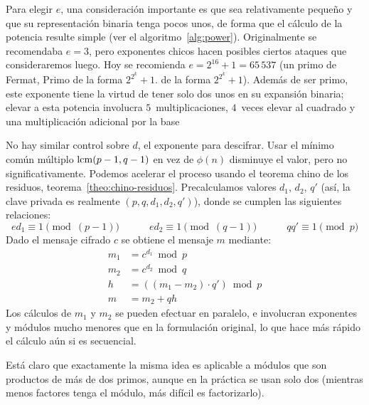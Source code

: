   Para elegir \(e\),
  una consideración importante es que sea relativamente pequeño
  y que su representación binaria tenga pocos unos,
  de forma que el cálculo de la potencia resulte simple
  (ver el algoritmo~\ref{alg:power}).
  Originalmente se recomendaba \(e = 3\),
  pero exponentes chicos hacen posibles
  ciertos ataques que consideraremos luego.
  Hoy se recomienda \(e = 2^{16} + 1 = 65\,537\)
  (un primo de Fermat,%
	    {Primo de la forma \(2^{2^k} + 1\).}
   de la forma \(2^{2^k} + 1\)).
  Además de ser primo,
  este exponente tiene la virtud
  de tener solo dos unos en su expansión binaria;%
  elevar a esta potencia involucra \(5\)~multiplicaciones,
  \(4\)~veces elevar al cuadrado
  y una multiplicación adicional por la base

  No hay similar control sobre \(d\),
  el exponente para descifrar.
  Usar el mínimo común múltiplo%
   \(\operatorname{lcm}(p - 1, q - 1)\) en vez de \(\phi(n)\)
  disminuye el valor,
  pero no significativamente.
  Podemos acelerar el proceso
  usando el teorema chino de los residuos,%
  teorema~\ref{theo:chino-residuos}.
  Precalculamos valores \(d_1\), \(d_2\), \(q'\)
  (así, la clave privada es realmente \((p, q, d_1, d_2, q')\)),
  donde se cumplen las siguientes relaciones:
  \begin{equation*}
    e d_1
      \equiv 1 \pmod{(p - 1)}
    \hspace{3em}
    e d_2
      \equiv 1 \pmod{(q - 1)}
    \hspace{3em}
    q q'
      \equiv 1 \pmod{p}
  \end{equation*}
  Dado el mensaje cifrado \(c\)
  se obtiene el mensaje \(m\) mediante:
  \begin{align*}
    m_1
      &= c^{d_1} \bmod p \\
    m_2
      &= c^{d_2} \bmod q \\
    h
      &= ((m_1 - m_2) \cdot q') \bmod p \\
    m
      &= m_2 + q h
  \end{align*}
  Los cálculos de \(m_1\) y \(m_2\) se pueden efectuar en paralelo,
  e involucran exponentes y módulos mucho menores
  que en la formulación original,
  lo que hace más rápido el cálculo aún si es secuencial.

  Está claro que exactamente la misma idea es aplicable a módulos
  que son productos de más de dos primos,
  aunque en la práctica se usan solo dos
  (mientras menos factores tenga el módulo,
   más difícil es factorizarlo).

